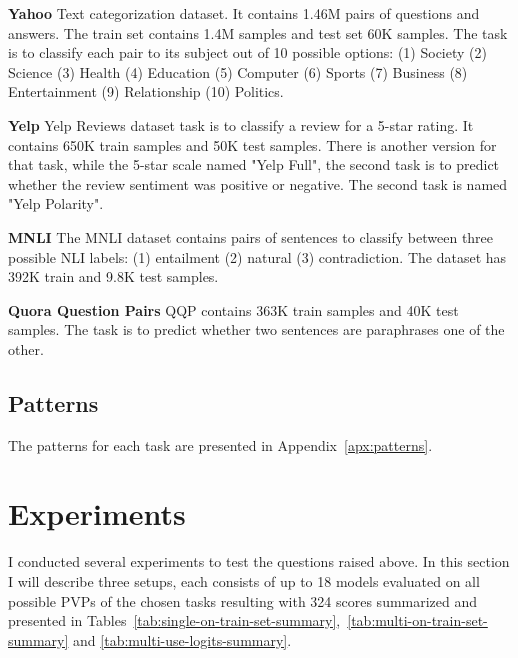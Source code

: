 \documentclass[11pt,a4paper]{article}
\begin{document}
\vspace{8pt}
\noindent \textbf{Yahoo} \quad
Text categorization dataset. It contains 1.46M pairs of questions and answers.
The train set contains 1.4M samples and test set 60K samples.
The task is to classify each pair to its subject out of 10 possible options: (1) Society (2) Science (3) Health (4) Education (5) Computer (6) Sports (7) Business (8) Entertainment (9) Relationship (10) Politics.

\vspace{8pt}
\noindent \textbf{Yelp} \quad
Yelp Reviews dataset task is to classify a review for a 5-star rating.
It contains 650K train samples and 50K test samples.
There is another version for that task, while the 5-star scale named "Yelp Full", the second task is to predict whether the review sentiment was positive or negative.
The second task is named "Yelp Polarity".

\vspace{8pt}
\noindent \textbf{MNLI} \quad
The MNLI dataset contains pairs of sentences to classify between three possible NLI labels: (1) entailment (2) natural (3) contradiction. 
The dataset has 392K train and 9.8K test samples. 

\vspace{8pt}
\noindent \textbf{Quora Question Pairs} \quad
QQP contains 363K train samples and 40K test samples.
The task is to predict whether two sentences are paraphrases one of the other.

\subsection{Patterns}
The patterns for each task are presented in Appendix~\ref{apx:patterns}.


\section{Experiments}
\label{sec:experiments}



I conducted several experiments to test the questions raised above.
In this section I will describe three setups, each consists of up to 18 models evaluated on all possible PVPs of the chosen tasks resulting with 324 scores summarized and presented in Tables~\ref{tab:single-on-train-set-summary},~\ref{tab:multi-on-train-set-summary} and \ref{tab:multi-use-logits-summary}.
\end{document}
